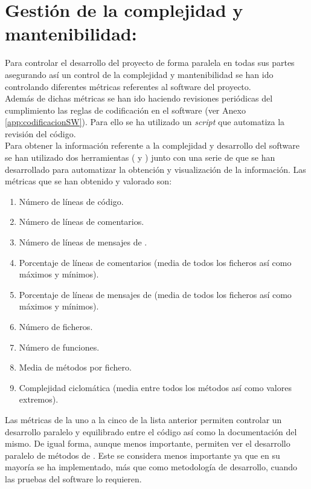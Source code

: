 \section{Gestión de la complejidad y mantenibilidad:} \label{sec:SW:gestion_complejidad}
    Para controlar el desarrollo del proyecto de forma paralela en todas sus partes asegurando así un control de la complejidad y mantenibilidad se han ido controlando diferentes métricas referentes al software del proyecto. 
    \\ 
    
    Además de dichas métricas se han ido haciendo revisiones periódicas del cumplimiento las reglas de codificación en el software (ver Anexo \ref{app:codificacionSW}). Para ello se ha utilizado un \textit{script}  que automatiza la revisión del código.
    \\
    
    Para obtener la información referente a la complejidad y desarrollo del software se han utilizado dos herramientas ( y ) junto con una serie de  que se han desarrollado para automatizar la obtención y visualización de la información. Las métricas que se han obtenido y valorado son:
    
    \begin{enumerate}
        \item Número de líneas de código.
        \item Número de líneas de comentarios.
        \item Número de líneas de mensajes de .
        \item Porcentaje de líneas de comentarios (media de todos los ficheros así como máximos y mínimos).
        \item Porcentaje de líneas de mensajes de  (media de todos los ficheros así como máximos y mínimos).
        \item Número de ficheros.
        \item Número de funciones.
        \item Media de métodos por fichero.
        \item Complejidad ciclomática  (media entre todos los métodos así como valores extremos).
    \end{enumerate}
    
    Las métricas de la uno a la cinco de la lista anterior permiten controlar un desarrollo paralelo y equilibrado entre el código así como la documentación del mismo. De igual forma, aunque menos importante, permiten ver el desarrollo paralelo de métodos de . Este se considera menos importante ya que en su mayoría se ha implementado, más que como metodología de desarrollo, cuando las pruebas del software lo requieren.
    \\ 
    
